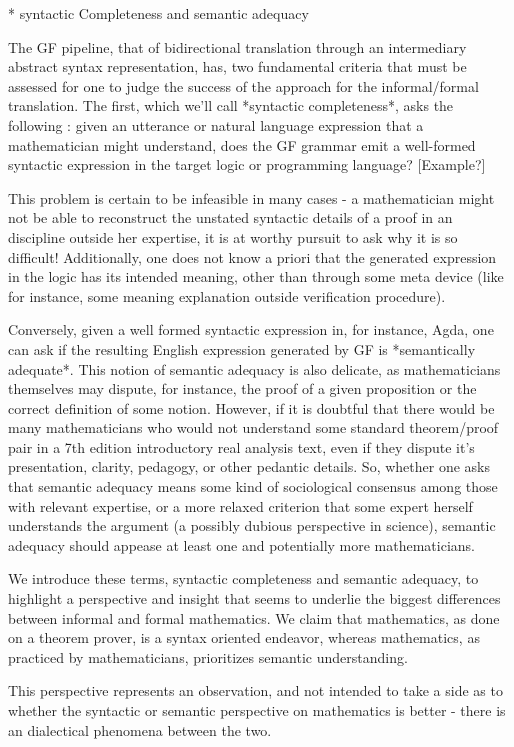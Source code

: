   * syntactic Completeness and semantic adequacy

The GF pipeline, that of bidirectional translation through an intermediary
abstract syntax representation, has, two fundamental criteria that must be
assessed for one to judge the success of the approach for the informal/formal
translation. The first, which we'll call *syntactic completeness*, asks the
following : given an utterance or natural language expression that a
mathematician might understand, does the GF grammar emit a well-formed syntactic
expression in the target logic or programming language? [Example?]

This problem is certain to be infeasible in many cases - a mathematician might
not be able to reconstruct the unstated syntactic details of a proof in an
discipline outside her expertise, it is at worthy pursuit to ask why it is so
difficult! Additionally, one does not know a priori that the generated
expression in the logic has its intended meaning, other than through some meta
device (like for instance, some meaning explanation outside verification
procedure).

Conversely, given a well formed syntactic expression in, for instance, Agda, one
can ask if the resulting English expression generated by GF is *semantically
adequate*. This notion of semantic adequacy is also delicate, as mathematicians
themselves may dispute, for instance, the proof of a given proposition or the
correct definition of some notion. However, if it is doubtful that there would
be many mathematicians who would not understand some standard theorem/proof pair
in a 7th edition introductory real analysis text, even if they dispute it's
presentation, clarity, pedagogy, or other pedantic details. So, whether one asks
that semantic adequacy means some kind of sociological consensus among those
with relevant expertise, or a more relaxed criterion that some expert herself
understands the argument (a possibly dubious perspective in science), semantic
adequacy should appease at least one and potentially more mathematicians.

We introduce these terms, syntactic completeness and semantic adequacy, to
highlight a perspective and insight that seems to underlie the biggest
differences between informal and formal mathematics. We claim that mathematics,
as done on a theorem prover, is a syntax oriented endeavor, whereas mathematics,
as practiced by mathematicians, prioritizes semantic understanding.

This perspective represents an observation, and not intended to take a side as
to whether the syntactic or semantic perspective on mathematics is better -
there is an dialectical phenomena between the two.

